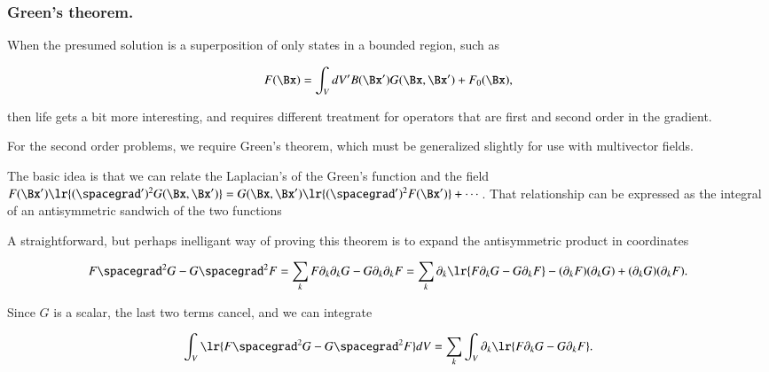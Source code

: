 \subsubsection{Green's theorem.}

When the presumed solution is a superposition of only states in a bounded region, such as

\begin{dmath}\label{eqn:greensFunctionSolutions:200}
F(\Bx) = \int_V dV' B(\Bx') G(\Bx, \Bx') + F_0(\Bx),
\end{dmath}

then life gets a bit more interesting, and requires different treatment for operators that are first and second order in the gradient.

For the second order problems, we require Green's theorem, which must be generalized slightly for use with multivector fields.

The basic idea is that we can relate the Laplacian's of the Green's function and the field
\( F(\Bx') \lr{ (\spacegrad')^2 G(\Bx, \Bx') } = G(\Bx, \Bx') \lr{ (\spacegrad')^2 F(\Bx')} + \cdots \).
That relationship can be expressed as the integral of an antisymmetric sandwich of the two functions


A straightforward, but perhaps inelligant way of proving this theorem is to expand the antisymmetric product in coordinates

\begin{dmath}\label{eqn:greensFunctionSolutions:260}
F \spacegrad^2 G - G \spacegrad^2 F
=
\sum_k F \partial_k \partial_k G - G \partial_k \partial_k F
=
\sum_k \partial_k \lr{
F \partial_k G - G \partial_k F
}
-
(\partial_k F)(\partial_k G) + (\partial_k G)(\partial_k F).
\end{dmath}

Since \( G \) is a scalar, the last two terms cancel, and we can integrate

\begin{dmath}\label{eqn:greensFunctionSolutions:280}
\int_V \lr{ F \spacegrad^2 G - G \spacegrad^2 F } dV
=
\sum_k \int_V \partial_k \lr{ F \partial_k G - G \partial_k F }.
\end{dmath}

